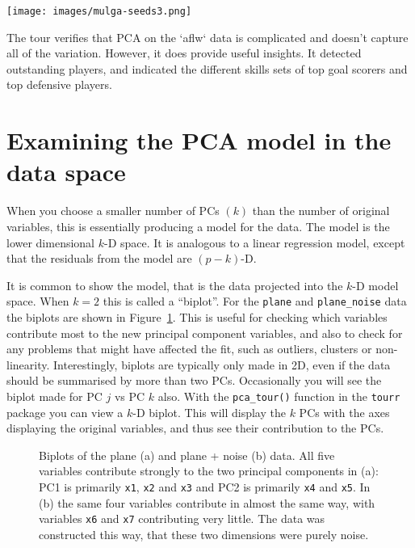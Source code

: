 \documentclass[
  letterpaper,
]{krantz}
\newcommand{\insightbox}[1]{%
\noindent\colorbox{insight!30}{%
\begin{minipage}{0.98\textwidth}%
    \centering%
    \begin{minipage}[c]{0.15\textwidth} %
      \texttt{[image: images/mulga-seeds3.png]} %
    \end{minipage}%
    \hfill %
    \begin{minipage}[c]{0.8\textwidth} %
      \bigskip%
      \textsf{#1}%
      \bigskip%
    \end{minipage}%
    \hspace*{3mm}%
  \end{minipage}%
}%
}
\begin{document}
\insightbox{The tour verifies that PCA on the `aflw` data is complicated and doesn't capture all of the variation. However, it does provide useful insights. It detected outstanding players, and indicated the different skills sets of top goal scorers and top defensive players.}

\section{Examining the PCA model in the data
space}\label{examining-the-pca-model-in-the-data-space}


When you choose a smaller number of PCs \((k)\) than the number of
original variables, this is essentially producing a model for the data.
The model is the lower dimensional \(k\)-D space. It is analogous to a
linear regression model, except that the residuals from the model are
\((p-k)\)-D.

It is common to show the model, that is the data projected into the
\(k\)-D model space. When \(k=2\) this is called a ``biplot''. For the
\texttt{plane} and \texttt{plane\_noise} data the biplots are shown in
Figure~\ref{fig-plane-biplot}. This is useful for checking which
variables contribute most to the new principal component variables, and
also to check for any problems that might have affected the fit, such as
outliers, clusters or non-linearity. Interestingly, biplots are
typically only made in 2D, even if the data should be summarised by more
than two PCs. Occasionally you will see the biplot made for PC \(j\) vs
PC \(k\) also. With the \texttt{pca\_tour()} function in the
\texttt{tourr} package you can view a \(k\)-D biplot. This will display
the \(k\) PCs with the axes displaying the original variables, and thus
see their contribution to the PCs.

\begin{figure}


\caption{\label{fig-plane-biplot}Biplots of the plane (a) and plane +
noise (b) data. All five variables contribute strongly to the two
principal components in (a): PC1 is primarily \texttt{x1}, \texttt{x2}
and \texttt{x3} and PC2 is primarily \texttt{x4} and \texttt{x5}. In (b)
the same four variables contribute in almost the same way, with
variables \texttt{x6} and \texttt{x7} contributing very little. The data
was constructed this way, that these two dimensions were purely noise.}

\end{figure}%
\end{document}
